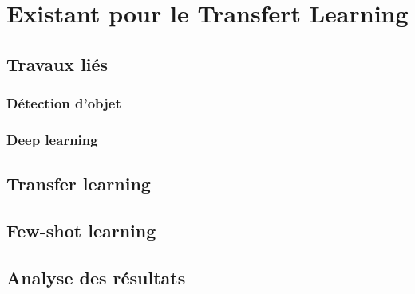 \chapter{Existant pour le Transfert Learning}
\label{chap:etat-art}

\section{Travaux liés}
\label{sec:travaux-lies}

\subsection{Détection d'objet}
\label{subsec:detection-objet}


\subsection{Deep learning}
\label{subsec:deep-learning}

\section{Transfer learning}
\label{sec:transfer-learning}

\section{Few-shot learning}
\label{sec:FSL}

\section{Analyse des résultats}
\label{sec:analyse-resultats}